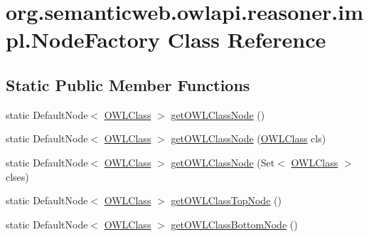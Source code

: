 \hypertarget{classorg_1_1semanticweb_1_1owlapi_1_1reasoner_1_1impl_1_1_node_factory}{\section{org.\-semanticweb.\-owlapi.\-reasoner.\-impl.\-Node\-Factory Class Reference}
\label{classorg_1_1semanticweb_1_1owlapi_1_1reasoner_1_1impl_1_1_node_factory}
}
\subsection*{Static Public Member Functions}
\begin{DoxyCompactItemize}
\item 
static Default\-Node$<$ \hyperlink{interfaceorg_1_1semanticweb_1_1owlapi_1_1model_1_1_o_w_l_class}{O\-W\-L\-Class} $>$ \hyperlink{classorg_1_1semanticweb_1_1owlapi_1_1reasoner_1_1impl_1_1_node_factory_a46d7d3ddc0ad566521e809489248c22a}{get\-O\-W\-L\-Class\-Node} ()
\item 
static Default\-Node$<$ \hyperlink{interfaceorg_1_1semanticweb_1_1owlapi_1_1model_1_1_o_w_l_class}{O\-W\-L\-Class} $>$ \hyperlink{classorg_1_1semanticweb_1_1owlapi_1_1reasoner_1_1impl_1_1_node_factory_a92fd795ddffe66e028c4636d5d8d0094}{get\-O\-W\-L\-Class\-Node} (\hyperlink{interfaceorg_1_1semanticweb_1_1owlapi_1_1model_1_1_o_w_l_class}{O\-W\-L\-Class} cls)
\item 
static Default\-Node$<$ \hyperlink{interfaceorg_1_1semanticweb_1_1owlapi_1_1model_1_1_o_w_l_class}{O\-W\-L\-Class} $>$ \hyperlink{classorg_1_1semanticweb_1_1owlapi_1_1reasoner_1_1impl_1_1_node_factory_ae9696783c3f413d73757fc0e3d8a4470}{get\-O\-W\-L\-Class\-Node} (Set$<$ \hyperlink{interfaceorg_1_1semanticweb_1_1owlapi_1_1model_1_1_o_w_l_class}{O\-W\-L\-Class} $>$ clses)
\item 
static Default\-Node$<$ \hyperlink{interfaceorg_1_1semanticweb_1_1owlapi_1_1model_1_1_o_w_l_class}{O\-W\-L\-Class} $>$ \hyperlink{classorg_1_1semanticweb_1_1owlapi_1_1reasoner_1_1impl_1_1_node_factory_a5d3d95cf8b229b8551928c218848de96}{get\-O\-W\-L\-Class\-Top\-Node} ()
\item 
static Default\-Node$<$ \hyperlink{interfaceorg_1_1semanticweb_1_1owlapi_1_1model_1_1_o_w_l_class}{O\-W\-L\-Class} $>$ \hyperlink{classorg_1_1semanticweb_1_1owlapi_1_1reasoner_1_1impl_1_1_node_factory_ad981fbeb5decf1e2810ae798d9e6d777}{get\-O\-W\-L\-Class\-Bottom\-Node} ()
\item 

\end{DoxyCompactItemize}
